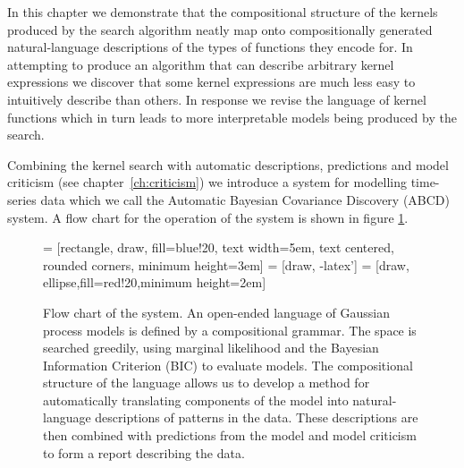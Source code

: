 In this chapter we demonstrate that the compositional structure of the kernels produced by the search algorithm neatly map onto compositionally generated natural-language descriptions of the types of functions they encode for.
In attempting to produce an algorithm that can describe arbitrary kernel expressions we discover that some kernel expressions are much less easy to intuitively describe than others.
In response we revise the language of kernel functions which in turn leads to more interpretable models being produced by the search.

Combining the kernel search with automatic descriptions, predictions and model criticism (see chapter~\ref{ch:criticism}) we introduce a system for modelling time-series data which we call the Automatic Bayesian Covariance Discovery (ABCD) system.
A flow chart for the operation of the system is shown in figure \ref{fig:description:flow}.

\begin{figure}[ht]
  \centering
   = [rectangle, draw, fill=blue!20, 
                       text width=5em, text centered, rounded corners, minimum height=3em]
   = [draw, -latex']
   = [draw, ellipse,fill=red!20,minimum height=2em]
    
  \caption{Flow chart of the \procedurename{} system.
  An open-ended language of Gaussian process models is defined by a compositional grammar.
  The space is searched greedily, using marginal likelihood and the Bayesian Information Criterion (BIC) to evaluate models.
  The  compositional structure of the language allows us to develop a method for automatically translating components of the model into natural-language descriptions of patterns in the data.
  These descriptions are then combined with predictions from the model and model criticism to form a report describing the data.}
  \label{fig:description:flow}
\end{figure}

